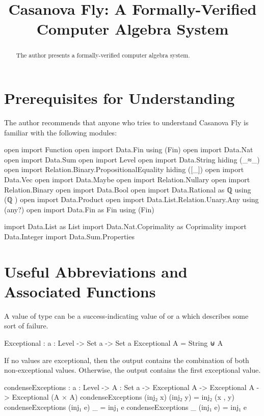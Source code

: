 \documentclass{report}
\title{Casanova Fly: A Formally-Verified Computer Algebra System}
\begin{document}
\maketitle{}

\begin{abstract}
The author presents a formally-verified computer algebra system.
\end{abstract}

\chapter{Prerequisites for Understanding}
The author recommends that anyone who tries to understand Casanova Fly is familiar with the following modules:

\begin{code}
open import Function
open import Data.Fin using (Fin)
open import Data.Nat
open import Data.Sum
open import Level
open import Data.String hiding (_≈_)
open import Relation.Binary.PropositionalEquality hiding ([_])
open import Data.Vec
open import Data.Maybe
open import Relation.Nullary
open import Relation.Binary
open import Data.Bool
open import Data.Rational
  as ℚ
  using (ℚ
        )
open import Data.Product
open import Data.List.Relation.Unary.Any using (any?)
open import Data.Fin as Fin using (Fin)

import Data.List as List
import Data.Nat.Coprimality as Coprimality
import Data.Integer
import Data.Sum.Properties
\end{code}

\chapter{Useful Abbreviations and Associated Functions}
A value of type   can be a success-indicating value of  or a  which describes some sort of failure.

\begin{code}
Exceptional : {a : Level} -> Set a -> Set a
Exceptional A = String ⊎ A
\end{code}

If no values are exceptional, then the output contains the combination of both non-exceptional values.  Otherwise, the output contains the first exceptional value.

\begin{code}
condenseExceptions : {a : Level} ->
                     {A : Set a} ->
                     Exceptional A ->
                     Exceptional A ->
                     Exceptional (A × A)
condenseExceptions (inj₂ x) (inj₂ y) = inj₂ (x , y)
condenseExceptions (inj₁ e) _ = inj₁ e
condenseExceptions _ (inj₁ e) = inj₁ e
\end{code}
\end{document}
